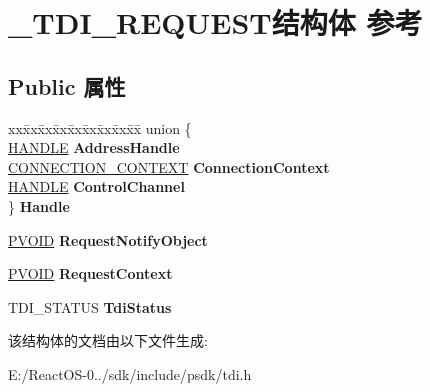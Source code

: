 \hypertarget{struct___t_d_i___r_e_q_u_e_s_t}{}\section{\+\_\+\+T\+D\+I\+\_\+\+R\+E\+Q\+U\+E\+S\+T结构体 参考}
\label{struct___t_d_i___r_e_q_u_e_s_t}
\subsection*{Public 属性}
\begin{DoxyCompactItemize}
\item 
\mbox{\label{struct___t_d_i___r_e_q_u_e_s_t_ab1f7cc7076499ff3b145662e6dea83a3}} 
\begin{tabbing}
xx\=xx\=xx\=xx\=xx\=xx\=xx\=xx\=xx\=\kill
union \{\\
\>\hyperlink{interfacevoid}{HANDLE} {\bfseries AddressHandle}\\
\>\hyperlink{interfacevoid}{CONNECTION\_CONTEXT} {\bfseries ConnectionContext}\\
\>\hyperlink{interfacevoid}{HANDLE} {\bfseries ControlChannel}\\
\} {\bfseries Handle}\\

\end{tabbing}\item 
\mbox{\label{struct___t_d_i___r_e_q_u_e_s_t_a55cfd89d19d89ed5950ac628e6392e94}} 
\hyperlink{interfacevoid}{P\+V\+O\+ID} {\bfseries Request\+Notify\+Object}
\item 
\mbox{\label{struct___t_d_i___r_e_q_u_e_s_t_a310ea9aa6de4196a159233f968ef56f1}} 
\hyperlink{interfacevoid}{P\+V\+O\+ID} {\bfseries Request\+Context}
\item 
\mbox{\label{struct___t_d_i___r_e_q_u_e_s_t_af1aabe453ad899df0b469e4e52423815}} 
T\+D\+I\+\_\+\+S\+T\+A\+T\+US {\bfseries Tdi\+Status}
\end{DoxyCompactItemize}


该结构体的文档由以下文件生成\+:\begin{DoxyCompactItemize}
\item 
E\+:/\+React\+O\+S-\/0../sdk/include/psdk/tdi.\+h\end{DoxyCompactItemize}
